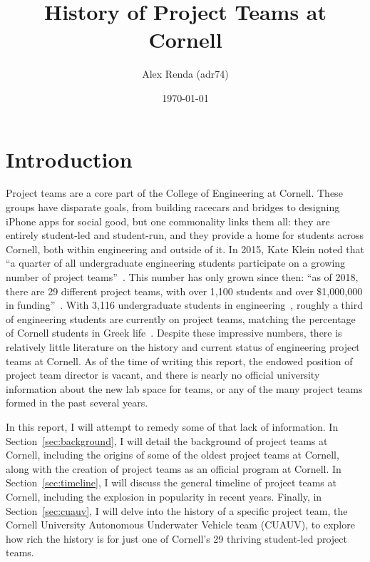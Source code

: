 \documentclass[12pt]{article}
\title{History of Project Teams at Cornell}
\author{Alex Renda (adr74)}
\date{\monthyeardate\today}
\begin{document}
\maketitle

\doublespacing

\section{Introduction}

Project teams are a core part of the College of Engineering at Cornell.
These groups have disparate goals, from building racecars and bridges to designing iPhone apps for social good, but one commonality links them all: they are entirely student-led and student-run, and they provide a home for students across Cornell, both within engineering and outside of it.
In 2015, Kate Klein noted that ``a quarter of all undergraduate engineering students participate on a growing number of project teams''~\cite{klein_engineering_2015}.
This number has only grown since then:
``as of 2018, there are 29 different project teams, with over 1,100 students and over \$1,000,000 in funding''~\cite{noauthor_project_2018}.
With 3,116 undergraduate students in engineering~\cite{westervelt_key_2017}, roughly a third of engineering students are currently on project teams, matching the percentage of Cornell students in Greek life~\cite{noauthor_sorority_2017}.
Despite these impressive numbers, there is relatively little literature on the history and current status of engineering project teams at Cornell.
As of the time of writing this report, the endowed position of project team director is vacant, and there is nearly no official university information about the new lab space for teams, or any of the many project teams formed in the past several years.

In this report, I will attempt to remedy some of that lack of information.
In Section~\ref{sec:background}, I will detail the background of project teams at Cornell, including the origins of some of the oldest project teams at Cornell, along with the creation of project teams as an official program at Cornell.
In Section~\ref{sec:timeline}, I will discuss the general timeline of project teams at Cornell, including the explosion in popularity in recent years.
Finally, in Section~\ref{sec:cuauv}, I will delve into the history of a specific project team, the Cornell University Autonomous Underwater Vehicle team (CUAUV), to explore how rich the history is for just one of Cornell's 29 thriving student-led project teams.
\end{document}
